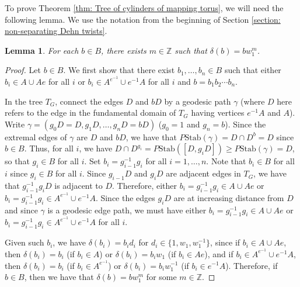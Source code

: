 \documentclass{amsart}
\newcommand{\Z}{\mathbb{Z}}
\theoremstyle{plain}
\newtheorem{lemma}[thm]{Lemma}
\theoremstyle{definition}
\theoremstyle{remark}
\begin{document}
To prove Theorem \ref{thm: Tree of cylinders of mapping torus}, we will need the following lemma. We use the notation from the beginning of Section \ref{section: non-separating Dehn twists}.

\begin{lemma}
    \label{lemma: action of delta on B}
    For each $b \in B$, there exists $m \in \Z$ such that $\delta(b) = bw_1^m$. 
\end{lemma}

\begin{proof}
    Let $b \in B$. We first show that there exist $b_1,\ldots,b_n \in B$ such that either $b_i \in A \cup Ae$ for all $i$ or $b_i \in A^{e^{-1}} \cup e^{-1}A$ for all $i$ and $b = b_1 b_2 \cdots b_n$.
    
    In the tree $T_G$, connect the edges $D$ and $bD$ by a geodesic path $\gamma$ (where $D$ here refers to the edge in the fundamental domain of $T_G$ having vertices $e^{-1}A$ and $A$). Write $\gamma = (g_0D = D, g_1D, \ldots, g_nD = bD)$ ($g_0 = 1$ and $g_n = b$). Since the extremal edges of $\gamma$ are $D$ and $bD$, we have that $P\mathrm{Stab}(\gamma) = D \cap D^b = D$ since $b \in B$. Thus, for all $i$, we have $D \cap D^{g_i} = P\mathrm{Stab}([D, g_i D]) \geq P\mathrm{Stab}(\gamma) = D$, so that $g_i \in B$ for all $i$. Set $b_i = g_{i-1}^{-1}g_{i}$ for all $i = 1,\ldots,n$. Note that $b_i \in B$ for all $i$ since $g_i \in B$ for all $i$. Since $g_{i-1}D$ and $g_iD$ are adjacent edges in $T_G$, we have that $g_{i-1}^{-1}g_iD$ is adjacent to $D$. Therefore, either $b_i = g_{i-1}^{-1}g_i \in A \cup Ae$ or $b_i = g_{i-1}^{-1}g_i \in A^{e^{-1}} \cup e^{-1}A$. Since the edges $g_iD$ are at increasing distance from $D$ and since $\gamma$ is a geodesic edge path, we must have either $b_i = g_{i-1}^{-1}g_i \in A \cup Ae$ or $b_i = g_{i-1}^{-1}g_i \in A^{e^{-1}} \cup e^{-1}A$ for all $i$. 

    Given such $b_i$, we have $\delta(b_i) = b_i d_i$ for $d_i \in \{1, w_1, w_1^{-1}\}$, since if $b_i \in A \cup Ae$, then $\delta(b_i) = b_i$ (if $b_i \in A$) or $\delta(b_i) = b_i w_1$ (if $b_i \in Ae$), and if $b_i \in A^{e^{-1}} \cup e^{-1}A$, then $\delta(b_i) = b_i$ (if $b_i \in A^{e^{-1}}$) or $\delta(b_i) = b_i w_1^{-1}$ (if $b_i \in e^{-1}A$). Therefore, if $b \in B$, then we have that $\delta(b) = b w_1^m$ for some $m \in \Z$.
\end{proof}
\end{document}
